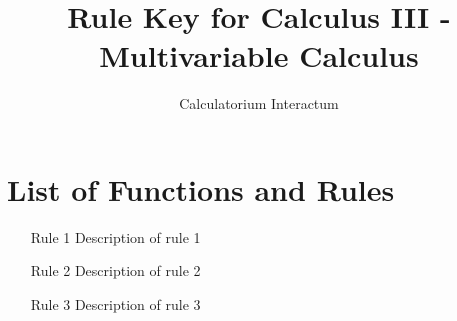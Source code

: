 \documentclass{article}
\title{Rule Key for Calculus III - Multivariable Calculus}
\author{Calculatorium Interactum}
\begin{document}
\maketitle

\section{List of Functions and Rules}

\begin{enumerate}
    \item [Rule 1] Description of rule 1
    \item [Rule 2] Description of rule 2
    \item [Rule 3] Description of rule 3
\end{enumerate}
\end{document}
